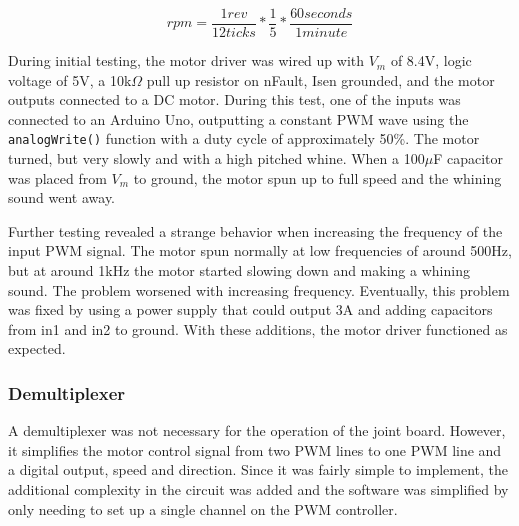 \begin{equation}
rpm = \frac{1 rev}{12 ticks} * \frac{1}{5} * \frac{60 seconds}{1 minute}
\label{eqn:motor_driver_test}
\end{equation}

\noindent During initial testing, the motor driver was wired up with $V_m$ of 8.4V, logic voltage of 5V, a 10k$\Omega$ pull up resistor on nFault, Isen grounded, and the motor outputs connected to a DC motor. During this test, one of the inputs was connected to an Arduino Uno, outputting a constant PWM wave using the \texttt{analogWrite()} function with a duty cycle of approximately 50\%. The motor turned, but very slowly and with a high pitched whine. When a 100$\mu$F capacitor was placed from $V_m$ to ground, the motor spun up to full speed and the whining sound went away.

\noindent Further testing revealed a strange behavior when increasing the frequency of the input PWM signal. The motor spun normally at low frequencies of around 500Hz, but at around 1kHz the motor started slowing down and making a whining sound. The problem worsened with increasing frequency. Eventually, this problem was fixed by using a power supply that could output 3A and adding capacitors from in1 and in2 to ground. With these additions, the motor driver functioned as expected.



\subsubsection{Demultiplexer}
A demultiplexer was not necessary for the operation of the joint board. However, it simplifies the motor control signal from two PWM lines to one PWM line and a digital output, speed and direction. Since it was fairly simple to implement, the additional complexity in the circuit was added and the software was simplified by only needing to set up a single channel on the PWM controller.

